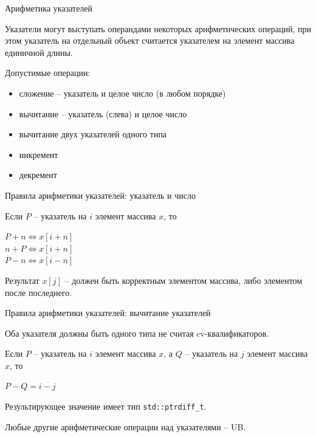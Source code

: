 \documentclass[unknownkeysallowed,xcolor=table]{beamer}
\begin{document}
\begin{frame}{Арифметика указателей}

Указатели могут выступать операндами некоторых арифметических операций, при этом указатель на отдельный объект считается указателем на элемент массива единичной длины.

\vspace{1em}

Допустимые операции:

\vspace{0.5em}

\begin{itemize}
  \item сложение -- указатель и целое число (в любом порядке)
  \item вычитание -- указатель (слева) и целое число
  \item вычитание двух указателей одного типа
  \item инкремент
  \item декремент
\end{itemize}

\end{frame}

\begin{frame}[fragile]{Правила арифметики указателей: указатель и число}

Если $P$ -- указатель на $i$ элемент массива $x$, то

\vspace{0.5em}

$P + n \Leftrightarrow x[i + n]$ \\ \vspace{0.5em}
$n + P \Leftrightarrow x[i + n]$ \\ \vspace{0.5em}
$P - n \Leftrightarrow x[i-n]$

\vspace{1em}

Результат $x[j]$ -- должен быть корректным элементом массива, либо элементом после последнего.

\end{frame}

\begin{frame}[fragile]{Правила арифметики указателей: вычитание указателей}

Оба указателя должны быть одного типа не считая cv-квалификаторов.

\vspace{1em}

Если $P$ -- указатель на $i$ элемент массива $x$, а $Q$ -- указатель на $j$ элемент массива $x$, то

\vspace{1em}

$P - Q = i - j$

\vspace{1em}

Результирующее значение имеет тип \lstinline{std::ptrdiff_t}.

\vspace{2em}

Любые другие арифметические операции над указателями -- UB.

\end{frame}
\end{document}
